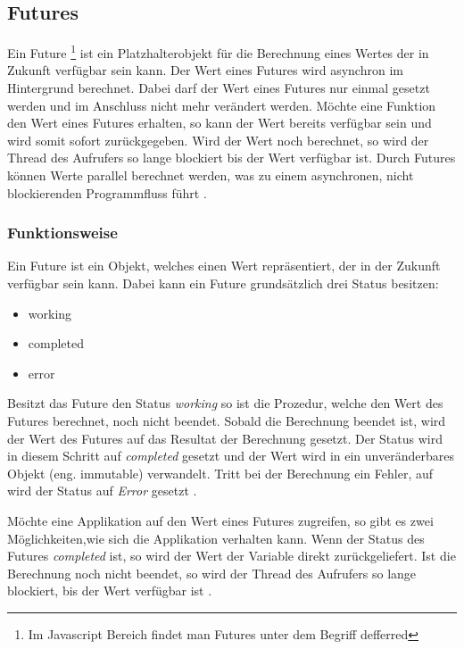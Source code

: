 \subsection{Futures}
\label{section:futures}

Ein Future \footnote{Im Javascript Bereich findet man Futures unter dem Begriff defferred} ist ein Platzhalterobjekt für die Berechnung eines Wertes der in Zukunft verfügbar sein kann. Der Wert eines Futures wird asynchron im Hintergrund berechnet. Dabei darf der Wert eines Futures nur einmal gesetzt werden und im Anschluss nicht mehr verändert werden. Möchte eine Funktion den Wert eines Futures erhalten, so kann der Wert bereits verfügbar sein und wird somit sofort zurückgegeben. Wird der Wert noch berechnet, so wird der Thread des Aufrufers so lange blockiert bis der Wert verfügbar ist. Durch Futures können Werte parallel berechnet werden, was zu einem asynchronen, nicht blockierenden Programmfluss führt \cite[]{ScalaFutures}. 

\subsubsection{Funktionsweise} 

Ein Future ist ein Objekt, welches einen Wert repräsentiert, der in der Zukunft verfügbar sein kann. Dabei kann ein Future grundsätzlich drei Status besitzen: 

\begin{itemize}
  \item working
  \item completed
  \item error
\end{itemize}  
Besitzt das Future den Status \emph{working} so ist die Prozedur, welche den Wert des Futures berechnet, noch nicht beendet. Sobald die Berechnung beendet ist, wird der Wert des Futures auf das Resultat der Berechnung gesetzt. Der Status wird in diesem Schritt auf \emph{completed} gesetzt und der Wert wird in ein unveränderbares Objekt (eng. immutable) verwandelt. Tritt bei der Berechnung ein Fehler, auf wird der Status auf \emph{Error} gesetzt \cite[]{ScalaFutures}. 

Möchte eine Applikation auf den Wert eines Futures zugreifen, so gibt es zwei Möglichkeiten,wie sich die Applikation verhalten kann. Wenn der Status des Futures \emph{completed} ist, so wird der Wert der Variable direkt zurückgeliefert. Ist die Berechnung noch nicht beendet, so wird der Thread des Aufrufers so lange blockiert, bis der Wert verfügbar ist \cite[]{ScalaFutures}.

